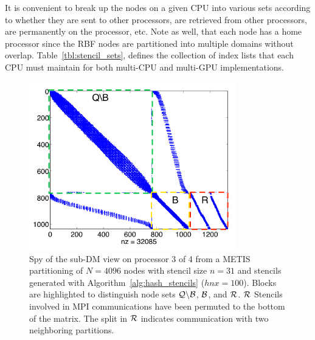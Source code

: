\documentclass{report}
\begin{document}
It is convenient to break up the nodes on a given CPU into various sets
according to whether they are sent to other processors, are retrieved from 
other processors, are permanently on the processor, etc. Note as well, 
that each node has a home processor since the RBF nodes are partitioned into 
multiple domains without overlap.
Table~\ref{tbl:stencil_sets}, defines the collection of index lists that each CPU must maintain for both multi-CPU and multi-GPU implementations.  


\begin{figure}[ht!]
\begin{center}
\includegraphics[width=9cm]{rbffd_methods_content/decompositions/spy_metis_stencil_example_labels.png}
\caption{Spy of the sub-DM view on processor 3 of 4 from a METIS partitioning of $N=4096$ nodes with stencil size $n=31$ and stencils generated with Algorithm~\ref{alg:hash_stencils} ($hnx=100$). Blocks are highlighted to distinguish node sets $\mathcal{Q} \backslash \mathcal{B}$, $\mathcal{B}$, and $\mathcal{R}$. $\mathcal{R}$ Stencils involved in MPI communications have been permuted to the bottom of the matrix. The split in $\mathcal{R}$ indicates communication with two neighboring partitions. }
\label{fig:decomp_spy}
\end{center}
\end{figure}
\end{document}
